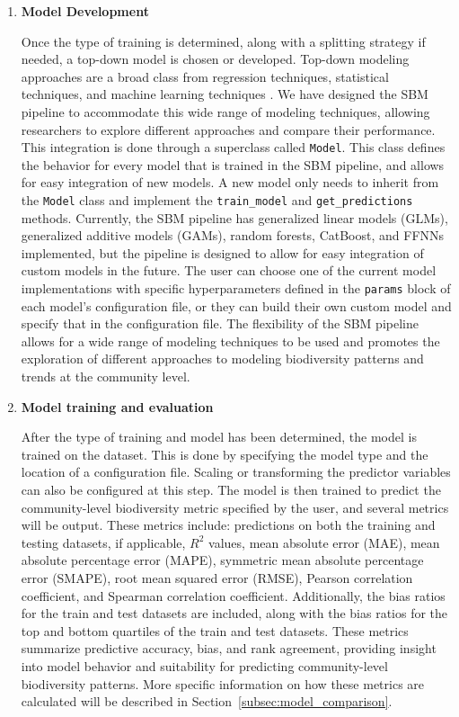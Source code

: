 \begin{enumerate}
\item \textbf{Model Development}

Once the type of training is determined, along with a splitting strategy if needed, a top-down model is chosen or developed. Top-down modeling approaches are a broad class from regression techniques, statistical techniques, and machine learning techniques \parencite{ferrier2002, olaya-marin_comparison_2013, mondal2021, andermann2022, brugere2023}. We have designed the SBM pipeline to accommodate this wide range of modeling techniques, allowing researchers to explore different approaches and compare their performance. This integration is done through a superclass called \texttt{Model}. This class defines the behavior for every model that is trained in the SBM pipeline, and allows for easy integration of new models. A new model only needs to inherit from the \texttt{Model} class and implement the \texttt{train\_model} and \texttt{get\_predictions} methods. Currently, the SBM pipeline has generalized linear models (GLMs), generalized additive models (GAMs), random forests, CatBoost, and FFNNs implemented, but the pipeline is designed to allow for easy integration of custom models in the future. The user can choose one of the current model implementations with specific hyperparameters defined in the \texttt{params} block of each model's configuration file, or they can build their own custom model and specify that in the configuration file. The flexibility of the SBM pipeline allows for a wide range of modeling techniques to be used and promotes the exploration of different approaches to modeling biodiversity patterns and trends at the community level.

\item \textbf{Model training and evaluation}\label{subsubsec:model_training_and_evaluation}

After the type of training and model has been determined, the model is trained on the dataset. This is done by specifying the model type and the location of a configuration file. Scaling or transforming the predictor variables can also be configured at this step. The model is then trained to predict the community-level biodiversity metric specified by the user, and several metrics will be output. These metrics include: predictions on both the training and testing datasets, if applicable, \(R^2\) values, mean absolute error (MAE), mean absolute percentage error (MAPE), symmetric mean absolute percentage error (SMAPE), root mean squared error (RMSE), Pearson correlation coefficient, and Spearman correlation coefficient. Additionally, the bias ratios for the train and test datasets are included, along with the bias ratios for the top and bottom quartiles of the train and test datasets. These metrics summarize predictive accuracy, bias, and rank agreement, providing insight into model behavior and suitability for predicting community-level biodiversity patterns. More specific information on how these metrics are calculated will be described in Section~\ref{subsec:model_comparison}.
\end{enumerate}


